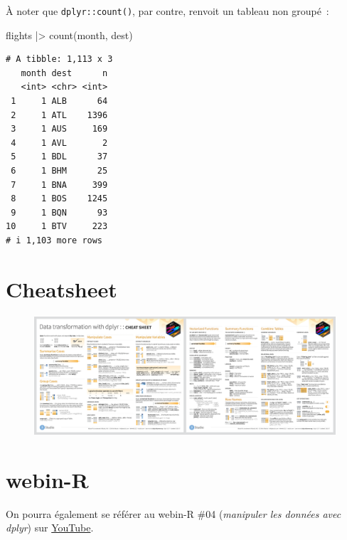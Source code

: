 \documentclass[
  letterpaper,
  DIV=11,
  numbers=noendperiod,
  oneside]{scrreprt}
\newenvironment{Shaded}{\begin{snugshade}}{\end{snugshade}}
\newcommand{\FunctionTok}[1]{\textcolor[rgb]{0.28,0.35,0.67}{#1}}
\newcommand{\NormalTok}[1]{\textcolor[rgb]{0.00,0.23,0.31}{#1}}
\newcommand{\SpecialCharTok}[1]{\textcolor[rgb]{0.37,0.37,0.37}{#1}}
\begin{document}
À noter que \texttt{dplyr::count()}, par contre, renvoit un tableau non
groupé~:

\begin{Shaded}
\begin{Highlighting}[]
\NormalTok{flights }\SpecialCharTok{|\textgreater{}} 
  \FunctionTok{count}\NormalTok{(month, dest)}
\end{Highlighting}
\end{Shaded}

\begin{verbatim}
# A tibble: 1,113 x 3
   month dest      n
   <int> <chr> <int>
 1     1 ALB      64
 2     1 ATL    1396
 3     1 AUS     169
 4     1 AVL       2
 5     1 BDL      37
 6     1 BHM      25
 7     1 BNA     399
 8     1 BOS    1245
 9     1 BQN      93
10     1 BTV     223
# i 1,103 more rows
\end{verbatim}

\hypertarget{cheatsheet}{%
\section{Cheatsheet}\label{cheatsheet}}

\begin{figure}

{\centering 

\href{https://github.com/rstudio/cheatsheets/blob/main/data-transformation.pdf}{\includegraphics{manipulation/ressources/dplyr-cheatsheet-thumbs.png}}

}

\end{figure}

\hypertarget{webin-r-3}{%
\section{webin-R}\label{webin-r-3}}

On pourra également se référer au webin-R \#04 (\emph{manipuler les
données avec dplyr}) sur \href{https://youtu.be/aFvBhgmawcs}{YouTube}.
\end{document}
